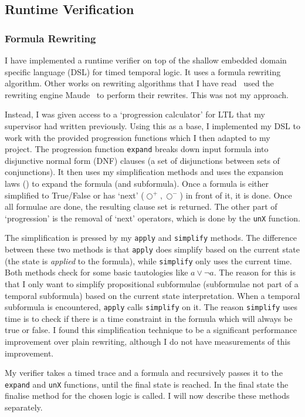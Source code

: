\documentclass[a4paper]{article}
\newcommand{\sn}{\bigcirc^+}
\newcommand{\wn}{\bigcirc^-}
\begin{document}
\subsection{Runtime Verification}
\subsubsection{Formula Rewriting}
I have implemented a runtime verifier on top of the shallow embedded domain specific language (DSL) for timed temporal logic. It uses a formula rewriting algorithm.
Other works on rewriting algorithms that I have read~\autocites{rosu2005rewriting,chai2013rewriting} used the rewriting engine Maude~\autocite{clavel2002maude} to perform their rewrites. This was not my approach.

Instead, I was given access to a `progression calculator' for LTL that my supervisor had written previously.
Using this as a base, I implemented my DSL to work with the provided progression functions which I then adapted to my project.
The progression function \texttt{expand} breaks down input formula into disjunctive normal form (DNF) clauses (a set of disjunctions between sets of conjunctions).
It then uses my simplification methods and uses the expansion laws () to expand the formula (and subformula).
Once a formula is either simplified to True/False or has `next' ($\sn,\wn$) in front of it, it is done. Once all formulae are done, the resulting clause set is returned.
The other part of `progression' is the removal of `next' operators, which is done by the \texttt{unX} function.

The simplification is pressed by my \texttt{apply} and \texttt{simplify} methods.
The difference between these two methods is that \texttt{apply} does simplify based on the current state (the state is \emph{applied} to the formula), while \texttt{simplify} only uses the current time. Both methods check for some basic tautologies like $a\lor\neg a$.
The reason for this is that I only want to simplify propositional subformulae (subformulae not part of a temporal subformula) based on the current state interpretation. When a temporal subformula is encountered, \texttt{apply} calls \texttt{simplify} on it.
The reason \texttt{simplify} uses time is to check if there is a time constraint in the formula which will always be true or false.
I found this simplification technique to be a significant performance improvement over plain rewriting, although I do not have measurements of this improvement.

My verifier takes a timed trace and a formula and recursively passes it to the \texttt{expand} and \texttt{unX} functions, until the final state is reached. In the final state the finalise method for the chosen logic is called. I will now describe these methods separately.
\end{document}
